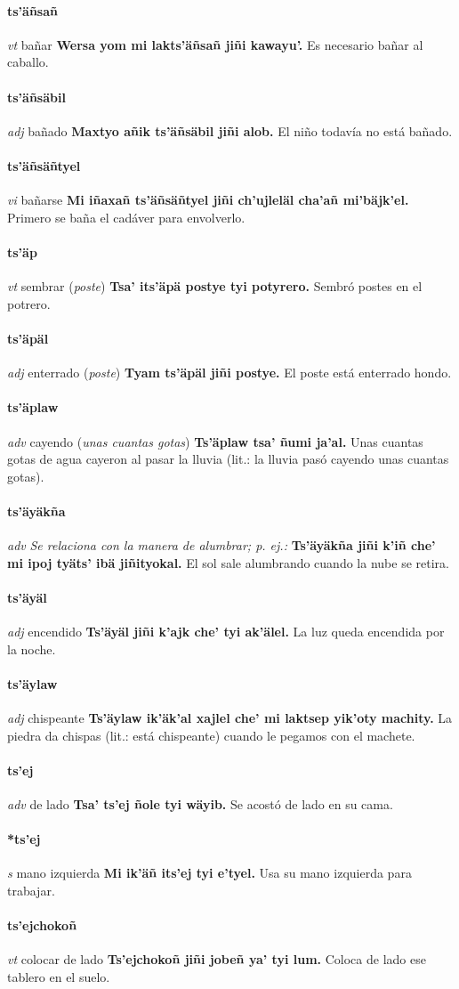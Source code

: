 \documentclass{scrbook}
\newcommand{\entry}[1]{\paragraph{#1}}
\newcommand{\nontranslationdef}[1]{\textit{#1}}
\newcommand{\partofspeech}[1]{\textit{#1}}
\newcommand{\spanishtranslation}[1]{#1}
\newcommand{\clarification}[1]{(\textit{#1})}
\newcommand{\cholexample}[1]{\textbf{#1}}
\newcommand{\exampletranslation}[1]{#1}
\begin{document}
\begin{multicols}{2}
\entry{ts'äñsañ}
\partofspeech{vt}
\spanishtranslation{bañar}
\cholexample{Wersa yom mi lakts'äñsañ jiñi kawayu'.}
\exampletranslation{Es necesario bañar al caballo.}

\entry{ts'äñsäbil}
\partofspeech{adj}
\spanishtranslation{bañado}
\cholexample{Maxtyo añik ts'äñsäbil jiñi alob.}
\exampletranslation{El niño todavía no está bañado.}

\entry{ts'äñsäñtyel}
\partofspeech{vi}
\spanishtranslation{bañarse}
\cholexample{Mi iñaxañ ts'äñsäñtyel jiñi ch'ujleläl cha'añ mi'bäjk'el.}
\exampletranslation{Primero se baña el cadáver para envolverlo.}

\entry{ts'äp}
\partofspeech{vt}
\spanishtranslation{sembrar}
\clarification{poste}
\cholexample{Tsa' its'äpä postye tyi potyrero.}
\exampletranslation{Sembró postes en el potrero.}

\entry{ts'äpäl}
\partofspeech{adj}
\spanishtranslation{enterrado}
\clarification{poste}
\cholexample{Tyam ts'äpäl jiñi postye.}
\exampletranslation{El poste está enterrado hondo.}

\entry{ts'äplaw}
\partofspeech{adv}
\spanishtranslation{cayendo}
\clarification{unas cuantas gotas}
\cholexample{Ts'äplaw tsa' ñumi ja'al.}
\exampletranslation{Unas cuantas gotas de agua cayeron al pasar la lluvia (lit.: la lluvia pasó cayendo unas cuantas gotas).}

\entry{ts'äyäkña}
\partofspeech{adv}
\nontranslationdef{Se relaciona con la manera de alumbrar; p. ej.:}
\cholexample{Ts'äyäkña jiñi k'iñ che' mi ipoj tyäts' ibä jiñityokal.}
\exampletranslation{El sol sale alumbrando cuando la nube se retira.}

\entry{ts'äyäl}
\partofspeech{adj}
\spanishtranslation{encendido}
\cholexample{Ts'äyäl jiñi k'ajk che' tyi ak'älel.}
\exampletranslation{La luz queda encendida por la noche.}

\entry{ts'äylaw}
\partofspeech{adj}
\spanishtranslation{chispeante}
\cholexample{Ts'äylaw ik'äk'al xajlel che' mi laktsep yik'oty machity.}
\exampletranslation{La piedra da chispas (lit.: está chispeante) cuando le pegamos con el machete.}

\entry{ts'ej}
\partofspeech{adv}
\spanishtranslation{de lado}
\cholexample{Tsa' ts'ej ñole tyi wäyib.}
\exampletranslation{Se acostó de lado en su cama.}

\entry{*ts'ej}
\partofspeech{s}
\spanishtranslation{mano izquierda}
\cholexample{Mi ik'äñ its'ej tyi e'tyel.}
\exampletranslation{Usa su mano izquierda para trabajar.}

\entry{ts'ejchokoñ}
\partofspeech{vt}
\spanishtranslation{colocar de lado}
\cholexample{Ts'ejchokoñ jiñi jobeñ ya' tyi lum.}
\exampletranslation{Coloca de lado ese tablero en el suelo.}


\end{multicols}
\end{document}
